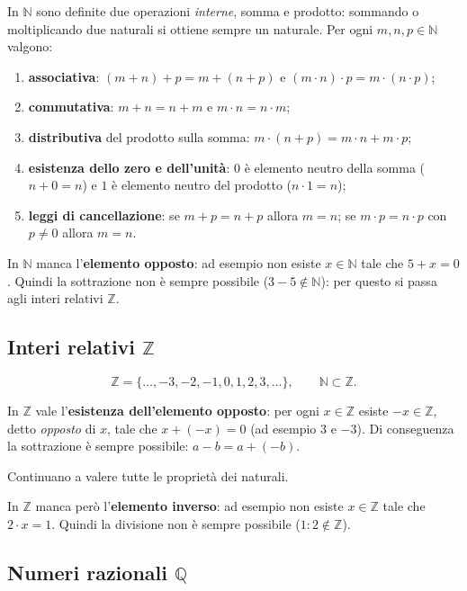 \documentclass[11pt,a4paper]{article}
\theoremstyle{definition}
\begin{document}
In $\mathbb{N}$ sono definite due operazioni \emph{interne}, somma e
prodotto: sommando o moltiplicando due naturali si ottiene sempre un
naturale. Per ogni $m, n, p \in \mathbb{N}$ valgono:
\begin{enumerate}
    \item \textbf{associativa}: $(m + n) + p = m + (n + p)$ e
          $(m \cdot n) \cdot p = m \cdot (n \cdot p)$;
    \item \textbf{commutativa}: $m + n = n + m$ e $m \cdot n = n \cdot m$;
    \item \textbf{distributiva} del prodotto sulla somma:
          $m \cdot (n + p) = m \cdot n + m \cdot p$;
    \item \textbf{esistenza dello zero e dell'unità}: $0$ è elemento neutro
          della somma ($n + 0 = n$) e $1$ è elemento neutro del prodotto
          ($n \cdot 1 = n$);
    \item \textbf{leggi di cancellazione}: se $m + p = n + p$ allora $m = n$;
          se $m \cdot p = n \cdot p$ con $p \neq 0$ allora $m = n$.
\end{enumerate}

In $\mathbb{N}$ manca l'\textbf{elemento opposto}: ad esempio non esiste
$x \in \mathbb{N}$ tale che $5 + x = 0$. Quindi la sottrazione non è
sempre possibile ($3 - 5 \notin \mathbb{N}$): per questo si passa agli
interi relativi $\mathbb{Z}$.


\subsection{Interi relativi $\mathbb{Z}$}

\[
\mathbb{Z} = \{\dots, -3, -2, -1, 0, 1, 2, 3, \dots\}, \qquad
\mathbb{N} \subset \mathbb{Z}.
\]

In $\mathbb{Z}$ vale l'\textbf{esistenza dell'elemento opposto}: per ogni
$x \in \mathbb{Z}$ esiste $-x \in \mathbb{Z}$, detto \emph{opposto} di $x$,
tale che $x + (-x) = 0$ (ad esempio $3$ e $-3$). Di conseguenza la
sottrazione è sempre possibile: $a - b = a + (-b)$.

Continuano a valere tutte le proprietà dei naturali.

In $\mathbb{Z}$ manca però l'\textbf{elemento inverso}: ad esempio non
esiste $x \in \mathbb{Z}$ tale che $2 \cdot x = 1$. Quindi la divisione
non è sempre possibile ($1 : 2 \notin \mathbb{Z}$).

\subsection{Numeri razionali $\mathbb{Q}$}
\end{document}
